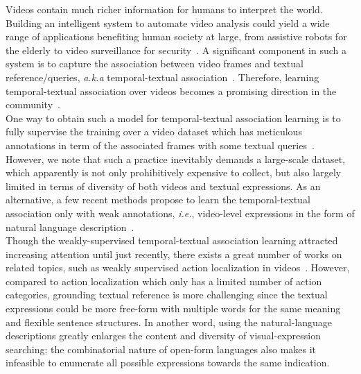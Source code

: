Videos 
contain much richer information for humans to interpret the world.
Building an intelligent system to automate video analysis could yield a wide range of applications benefiting human society at large, from assistive robots for the elderly to video surveillance for security~\citep{kim2018textual,yang2015robot,oh2011large,fang2020video2commonsense}. A significant component in such a system is to capture the association between video frames and textual reference/queries, \emph{a.k.a} temporal-textual association~\citep{gao2017tall,anne2017localizing,liu2018cross,ge2019mac}. Therefore, learning temporal-textual association over videos becomes a promising direction in the community~\citep{anne2017localizing,sun2019videobert,miech2019howto100m}.\\ One way to obtain such a model for temporal-textual association learning is to fully supervise the training over a video dataset which has meticulous annotations in term of the associated frames with some textual queries~\citep{chen2018temporally,anne2017localizing,gao2017tall,zhang2019man,ge2019mac}. However, we note that such a practice inevitably demands a large-scale  dataset, which apparently is not only prohibitively expensive to collect, but also largely limited in terms of diversity of both videos and  textual expressions. As an alternative, a few recent methods propose to learn the temporal-textual association only with weak annotations, \emph{i.e.}, video-level expressions in the form of natural language description~\citep{Mithun_2019_CVPR,lin2019weakly}.\\Though the weakly-supervised temporal-textual association learning attracted increasing attention until just recently, there exists a great number of works on related topics, such as weakly supervised action localization in videos~\citep{singh2017hide,paul2018w,mishra2018generative,nguyen2018weakly}.
However, compared to action localization which only has a limited number of action categories,
grounding textual reference is more challenging since the textual expressions 
could be more free-form with multiple words for the same meaning and flexible sentence structures.
In another word,
using the natural-language descriptions greatly
enlarges the content and diversity of visual-expression searching;
the combinatorial nature of open-form languages also makes it infeasible 
to enumerate all possible expressions towards the same indication.
